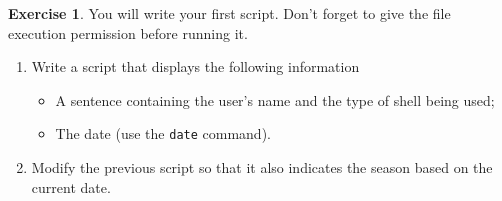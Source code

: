 \documentclass[a4paper,11pt]{article}
\newcommand{\itemb}{\item[$\bullet$]}
\theoremstyle{plain}
\theoremstyle{definition}
\newtheorem{exercice}{Exercise}
\begin{document}

\begin{exercice}

 You will write your first script. Don't forget to give the file execution permission before running it.
\begin{enumerate}
\item Write a script that displays the following information
\begin{itemize}
\itemb A sentence containing the user's name and the type of shell being used;
\itemb The date (use the \verb|date| command).
\end{itemize}
\item Modify the previous script so that it also indicates the season based on the current date.
\end{enumerate}
\end{exercice}
\end{document}
